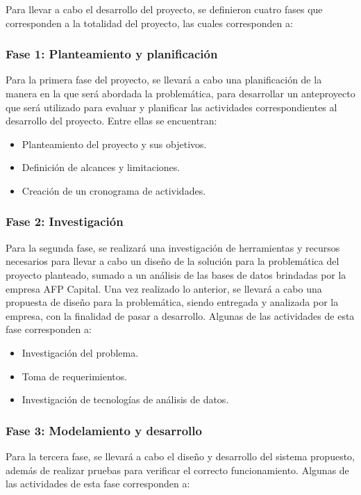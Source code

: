 Para llevar a cabo el desarrollo del proyecto, se definieron cuatro fases que corresponden a la totalidad del proyecto, las cuales corresponden a:

\subsubsection{Fase 1: Planteamiento y planificación}

Para la primera fase del proyecto, se llevará a cabo una planificación de la manera en la que será abordada la problemática, para desarrollar un anteproyecto que será utilizado para evaluar y planificar las actividades correspondientes al desarrollo del proyecto. Entre ellas se encuentran:

\begin{itemize}
    \item Planteamiento del proyecto y sus objetivos.
    \item Definición de alcances y limitaciones.
    \item Creación de un cronograma de actividades.
\end{itemize}

\subsubsection{Fase 2: Investigación}

Para la segunda fase, se realizará una investigación de herramientas y recursos necesarios para llevar a cabo un diseño de la solución para la problemática del proyecto planteado, sumado a un análisis de las bases de datos brindadas por la empresa AFP Capital. Una vez realizado lo anterior, se llevará a cabo una propuesta de diseño para la problemática, siendo entregada y analizada por la empresa, con la finalidad de pasar a desarrollo. Algunas de las actividades de esta fase corresponden a:

\begin{itemize}
    \item Investigación del problema.
    \item Toma de requerimientos.
    \item Investigación de tecnologías de análisis de datos.
\end{itemize}

\subsubsection{Fase 3: Modelamiento y desarrollo}
Para la tercera fase, se llevará a cabo el diseño y desarrollo del sistema propuesto, además de realizar pruebas para verificar el correcto funcionamiento. Algunas de las actividades de esta fase corresponden a:

